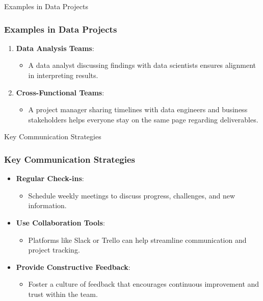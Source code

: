 \documentclass[aspectratio=169]{beamer}
\begin{document}
\begin{frame}[fragile]{Examples in Data Projects}
    \frametitle{Examples in Data Projects}
    \begin{enumerate}
        \item \textbf{Data Analysis Teams}:
            \begin{itemize}
                \item A data analyst discussing findings with data scientists ensures alignment in interpreting results.
            \end{itemize}
        \item \textbf{Cross-Functional Teams}:
            \begin{itemize}
                \item A project manager sharing timelines with data engineers and business stakeholders helps everyone stay on the same page regarding deliverables.
            \end{itemize}
    \end{enumerate}
\end{frame}

\begin{frame}[fragile]{Key Communication Strategies}
    \frametitle{Key Communication Strategies}
    \begin{itemize}
        \item \textbf{Regular Check-ins}:
            \begin{itemize}
                \item Schedule weekly meetings to discuss progress, challenges, and new information.
            \end{itemize}
        \item \textbf{Use Collaboration Tools}:
            \begin{itemize}
                \item Platforms like Slack or Trello can help streamline communication and project tracking.
            \end{itemize}
        \item \textbf{Provide Constructive Feedback}:
            \begin{itemize}
                \item Foster a culture of feedback that encourages continuous improvement and trust within the team.
            \end{itemize}
    \end{itemize}
\end{frame}
\end{document}
